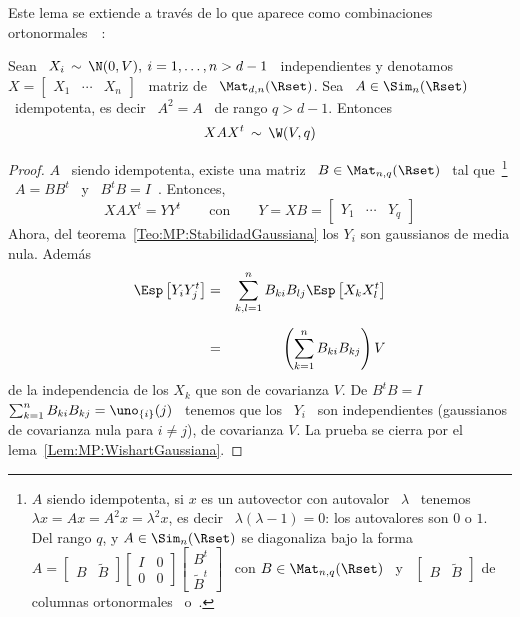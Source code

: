 Este  lema  se  extiende  a  trav\'es  de  lo  que  aparece  como  combinaciones
ortonormales~~\cite{Mui82, GupNag99, BilBre99, And03, Seb04, KotNad04}:
%
\begin{lema}\label{Lem:MP:WishartGaussianaIdempotenta}
%
  Sean \ $X_i \, \sim \, \N(0,V), \: i = 1, \ldots , n > d-1$ \ independientes y
  denotamos \ $X = \begin{bmatrix} X_1 & \cdots & X_n \end{bmatrix}$ \ matriz de
  \ $\Mat_{d,n}(\Rset)$. Sea  \ $A \in \Sim_n(\Rset)$ \  idempotenta, es decir \
  $A^2 = A$ \ de rango $q > d-1$. Entonces
  \[
  X A X^t \,\sim \, \W(V,q)
  \]
\end{lema}
%
\begin{proof}
  $A$ \  siendo idempotenta, existe una  matriz \ $B \in  \Mat_{n,q}(\Rset)$ \ tal
  que~\footnote{$A$ siendo idempotenta, si $x$  es un autovector con autovalor \
    $\lambda$ \ tenemos  \ $\lambda x = A x  = A^2 x = \lambda^2  x$, es decir \
    $\lambda (\lambda-1) = 0$: los autovalores  son $0$ o $1$.  Del rango $q$, y
    $A \in \Sim_n(\Rset)$  se diagonaliza bajo la forma \ $A  = \begin{bmatrix} B &
      \widetilde{B}   \end{bmatrix}    \begin{bmatrix}   I   &   0    \\   0   &
      0 \end{bmatrix} \begin{bmatrix} B^t\\ \widetilde{B}^t \end{bmatrix}$ \ con
    $B    \in     \Mat_{n,q}(\Rset)$    \    y    \     $\begin{bmatrix}    B    &
      \widetilde{B}             \end{bmatrix}$            de            columnas
    ortonormales~\cite[Teo.~21.5.7]{Har08} o~\cite{HorJoh13}.}  \  $A = B B^t$ \
  y \ $B^t B = I$~\cite{Har08}. Entonces,
  \[
  X A  X^t =  Y Y^t \qquad  \mbox{con} \qquad Y  = X  B = \begin{bmatrix}  Y_1 &
    \cdots & Y_q \end{bmatrix}
  \]
  Ahora,    del   teorema~\ref{Teo:MP:StabilidadGaussiana}    los    $Y_i$   son
  gaussianos de media nula. Adem\'as
  \begin{eqnarray*}
  \Esp\left[ Y_i Y_j^t \right] & = & \sum_{k,l=1}^n B_{ki} B_{lj} \Esp\left[ X_k
  X_l^t \right]\\[2mm]
  & = & \left( \sum_{k=1}^n B_{ki} B_{kj} \right) V
  \end{eqnarray*}
  de la independencia de los $X_k$ que son de covarianza $V$. De $B^t B = I$ \ie
  \ $\sum_{k=1}^n  B_{ki} B_{kj} = \uno_{\{i\}}(j)$  \ tenemos que los  \ $Y_i$ \
  son  independientes  (gaussianos  de  covarianza  nula para  $i  \ne  j$),  de
  covarianza      $V$.       La      prueba      se      cierra      por      el
  lema~\ref{Lem:MP:WishartGaussiana}.
\end{proof}
